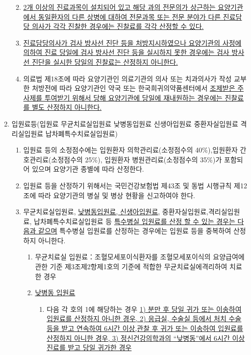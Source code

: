 \begin{enumerate}[1.]
\begin{enumerate}[가.]
\begin{enumerate}[(1)]
		\end{enumerate}
	\item \uline{2개 이상의 진료과목이 설치되어 있고 해당 과의 전문의가 상근하는 요양기관에서 동일환자의 다른 상병에 대하여 전문과목 또는 전문 분야가 다른 진료담당 의사가 각각 진찰한 경우에는 진찰료를 각각 산정할 수 있다.}
	\item \uline{진료담당의사가 검사\cntrdot{} 방사선 진단 등을 처방지시하였으나 요양기관의 사정에 의하여 진료 당일에 검사\cntrdot{} 방사선 진단 등을 실시하지 못한 경우에는 검사\cntrdot{} 방사선 진단을 실시한 당일의 진찰료는 산정하지 아니한다.}
	\item 의료법 제18조에 따라 요양기관인 의료기관의 의사 또는 치과의사가 작성\cntrdot{} 교부한 처방전에 따라 요양기관인 약국 또는 한국희귀의약품센터에서 \uline{조제받은 주사제를 투여받기 위해서 당해 요양기관에 당일에 재내원하는 경우에는 진찰료를 별도 산정하지 아니한다.}
	\end{enumerate}
\item 입원료등(입원료\cntrdot{} 무균치료실입원료\cntrdot{} 낮병동입원료\cntrdot{} 신생아입원료\cntrdot{} 중환자실입원료\cntrdot{} 격리실입원료\cntrdot{} 납차폐특수치료실입원료)
	\begin{enumerate}[가.]
	\item 입원료 등의 소정점수에는 입원환자 의학관리료(소정점수의 40\%),입원환자 간호관리료(소정점수의 25\%), 입원환자 병원관리료(소정점수의 35\%)가 포함되어 있으며 요양기관 종별에 따라 산정한다.
	\item 입원료 등을 산정하기 위해서는 국민건강보험법 제43조 및 동법 시행규칙 제12조에 따라 요양기관의 병실 및 병상 현황을 신고하여야 한다.
	\item 무균치료실입원료, \uline{낮병동입원료, 신생아입원료}, 중환자실입원료,격리실입원료, 납차폐특수치료실입원료 등 \uline{특수병실 입원료를 산정 할 수 있는 경우는 다음과 같으며} 특수병실 입원료를 산정하는 경우에는 입원료 등을 중복하여 산정하지 아니한다.
		\begin{enumerate}[(1)]\tightlist
		\item 무균치료실 입원료：조혈모세포이식환자를 조혈모세포이식의 요양급여에 관한 기준 제3조제2항제1호의 기준에 적합한 무균치료실에격리하여 치료한 경우
		\item \uline{낮병동 입원료}
			\begin{enumerate}[(가)]\tightlist
			\item 다음 각 호의 1에 해당하는 경우 \uline{1) 분만 후 당일 귀가 또는 이송하여 입원료를 산정하지 아니한 경우, 2) 응급실, 수술실 등에서 처치\cntrdot{} 수술 등을 받고 연속하여 6시간 이상,관찰 후 귀가 또는 이송하여 입원료를 산정하지 아니한 경우, 3) 정신건강의학과의 “낮병동”에서 6시간 이상 진료를 받고 당일 귀가한 경우}
			

\end{enumerate}
\end{enumerate}
\end{enumerate}
\end{enumerate}
